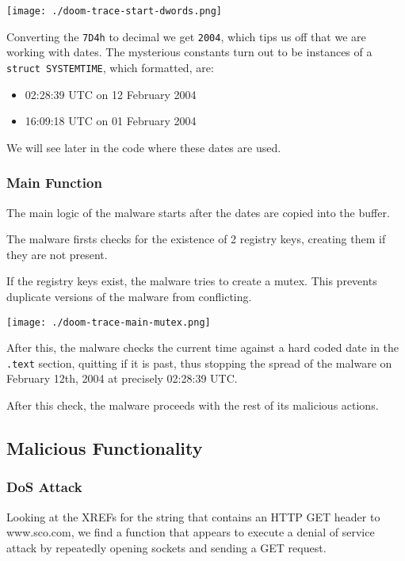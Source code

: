 \documentclass[11pt]{article}
\begin{document}
\begin{center}
\texttt{[image: ./doom-trace-start-dwords.png]}
\end{center}

Converting the \texttt{7D4h} to decimal we get \texttt{2004}, which tips us off that
we are working with dates. The mysterious constants turn out to be
instances of a \texttt{struct SYSTEMTIME}, which formatted, are:

\begin{itemize}
\item 02:28:39 UTC on 12 February 2004
\item 16:09:18 UTC on 01 February 2004
\end{itemize}

We will see later in the code where these dates are used.
\subsubsection{Main Function}
\label{sec:orgf5ed9a4}
The main logic of the malware starts after the dates are copied into
the buffer.

The malware firsts checks for the existence of 2 registry keys,
creating them if they are not present.

If the registry keys exist, the malware tries to create a mutex. This
prevents duplicate versions of the malware from conflicting.

\begin{center}
\texttt{[image: ./doom-trace-main-mutex.png]}
\end{center}

After this, the malware checks the current time against a hard coded
date in the \texttt{.text} section, quitting if it is past, thus stopping the
spread of the malware on February 12th, 2004 at precisely 02:28:39
UTC.

After this check, the malware proceeds with the rest of its malicious
actions.
\subsection{Malicious Functionality}
\label{sec:org82353ce}
\subsubsection{DoS Attack}
\label{sec:orgc3be3b7}
Looking at the XREFs for the string that contains an HTTP GET header
to www.sco.com, we find a function that appears to execute a denial of
service attack by repeatedly opening sockets and sending a GET
request.
\end{document}
